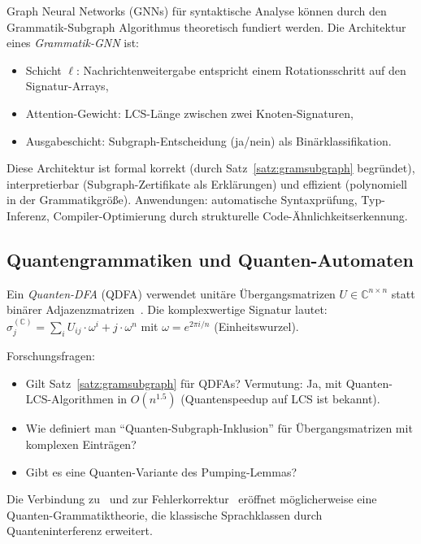 ﻿\documentclass[a4paper,12pt]{article}
\theoremstyle{definition}
\begin{document}
Graph Neural Networks (GNNs) f\"ur syntaktische Analyse k\"onnen durch den
Grammatik-Subgraph Algorithmus theoretisch fundiert werden.
Die Architektur eines \emph{Grammatik-GNN} ist:
\begin{itemize}
    \item Schicht $\ell$: Nachrichtenweitergabe entspricht einem Rotationsschritt
          auf den Signatur-Arrays,
    \item Attention-Gewicht: LCS-L\"ange zwischen zwei Knoten-Signaturen,
    \item Ausgabeschicht: Subgraph-Entscheidung (ja/nein) als Bin\"arklassifikation.
\end{itemize}
Diese Architektur ist formal korrekt (durch Satz~\ref{satz:gramsubgraph}
begr\"undet), interpretierbar (Subgraph-Zertifikate als Erkl\"arungen) und
effizient (polynomiell in der Grammatikgr\"o{\ss}e).
Anwendungen: automatische Syntaxpr\"ufung, Typ-Inferenz, Compiler-Optimierung
durch strukturelle Code-\"Ahnlichkeitserkennung.

\subsection{Quantengrammatiken und Quanten-Automaten}

Ein \emph{Quanten-DFA} (QDFA) verwendet unit\"are \"Ubergangsmatrizen
$U \in \mathbb{C}^{n \times n}$ statt bin\"arer Adjazenzmatrizen~\cite{epp2026quantum}.
Die komplexwertige Signatur lautet:
$\sigma_j^{(\mathbb{C})} = \sum_i U_{ij} \cdot \omega^i + j \cdot \omega^n$
mit $\omega = e^{2\pi i/n}$ (Einheitswurzel).

Forschungsfragen:
\begin{itemize}
    \item Gilt Satz~\ref{satz:gramsubgraph} f\"ur QDFAs?
          Vermutung: Ja, mit Quanten-LCS-Algorithmen in $O(n^{1.5})$
          (Quantenspeedup auf LCS ist bekannt).
    \item Wie definiert man ``Quanten-Subgraph-Inklusion'' f\"ur
          \"Ubergangsmatrizen mit komplexen Eintr\"agen?
    \item Gibt es eine Quanten-Variante des Pumping-Lemmas?
\end{itemize}
Die Verbindung zu~\cite{epp2026quantum} und zur Fehlerkorrektur~\cite{epp2026lattice}
er\"offnet m\"oglicherweise eine Quanten-Grammatiktheorie, die klassische
Sprachklassen durch Quanteninterferenz erweitert.
\end{document}
